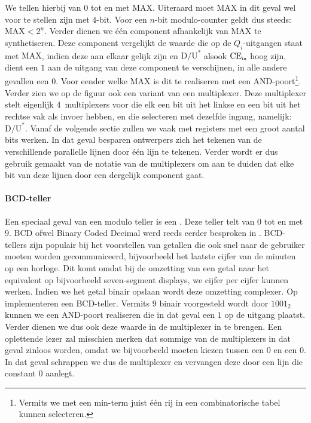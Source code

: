We tellen hierbij van $0$ tot en met $\mbox{MAX}$. Uiteraard moet $\mbox{MAX}$ in dit geval wel voor te stellen zijn met $4$-bit. Voor een $n$-bit modulo-counter geldt dus steeds: $\mbox{MAX}<2^n$. Verder dienen we \'e\'en component afhankelijk van $\mbox{MAX}$ te synthetiseren. Deze component vergelijkt de waarde die op de $Q_i$-uitgangen staat met $\mbox{MAX}$, indien deze aan elkaar gelijk zijn en $\mbox{D/U}^*$ alsook $\mbox{CE}_{\mbox{\tiny{in}}}$ hoog zijn, dient een $1$ aan de uitgang van deze component te verschijnen, in alle andere gevallen een $0$. Voor eender welke $\mbox{MAX}$ is dit te realiseren met een AND-poort\footnote{Vermits we met een min-term juist \'e\'en rij in een combinatorische tabel kunnen selecteren.}. Verder zien we op de figuur ook een variant van een multiplexer. Deze multiplexer stelt eigenlijk $4$~multiplexers voor die elk een bit uit het linkse en een bit uit het rechtse vak als invoer hebben, en die selecteren met dezelfde ingang, namelijk: $\mbox{D/U}^*$. Vanaf de volgende sectie zullen we vaak met registers met een groot aantal bits werken. In dat geval besparen ontwerpers zich het tekenen van de verschillende parallelle lijnen door \'e\'en lijn te tekenen. Verder wordt er dus gebruik gemaakt van de notatie van de multiplexers om aan te duiden dat elke bit van deze lijnen door een dergelijk component gaat.

\paragraph{BCD-teller}
Een speciaal geval van een modulo teller is een . Deze teller telt van $0$ tot en met $9$. BCD ofwel Binary Coded Decimal werd reeds eerder besproken in . BCD-tellers zijn populair bij het voorstellen van getallen die ook snel naar de gebruiker moeten worden gecommuniceerd, bijvoorbeeld het laatste cijfer van de minuten op een horloge. Dit komt omdat bij de omzetting van een getal naar het equivalent op bijvoorbeeld seven-segment displays, we cijfer per cijfer kunnen werken. Indien we het getal binair opslaan wordt deze omzetting complexer. Op  implementeren een BCD-teller. Vermits $9$ binair voorgesteld wordt door $1001_2$ kunnen we een AND-poort realiseren die in dat geval een $1$ op de uitgang plaatst. Verder dienen we dus ook deze waarde in de multiplexer in te brengen. Een oplettende lezer zal misschien merken dat sommige van de multiplexers in dat geval zinloos worden, omdat we bijvoorbeeld moeten kiezen tussen een $0$ en een $0$. In dat geval schrappen we dus de multiplexer en vervangen deze door een lijn die constant $0$ aanlegt.

